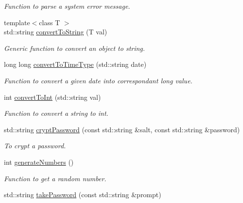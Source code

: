 \begin{DoxyCompactItemize}
\begin{DoxyCompactList}\small\item\em Function to parse a system error message. \item\end{DoxyCompactList}\item 
{\footnotesize template$<$class T $>$ }\\std::string \hyperlink{namespacevishnu_add18720aacc1db6052abecedd5d6feaa}{convertToString} (T val)
\begin{DoxyCompactList}\small\item\em Generic function to convert an object to string. \item\end{DoxyCompactList}\item 
long long \hyperlink{namespacevishnu_ae4208edfb8924443b0971e68cccfce02}{convertToTimeType} (std::string date)
\begin{DoxyCompactList}\small\item\em Function to convert a given date into correspondant long value. \item\end{DoxyCompactList}\item 
int \hyperlink{namespacevishnu_ac1899fb2792ddd63a003a06081fc9066}{convertToInt} (std::string val)
\begin{DoxyCompactList}\small\item\em Function to convert a string to int. \item\end{DoxyCompactList}\item 
std::string \hyperlink{namespacevishnu_ae8aa2ffafe24d1f575e8953d1d9d026e}{cryptPassword} (const std::string \&salt, const std::string \&password)
\begin{DoxyCompactList}\small\item\em To crypt a password. \item\end{DoxyCompactList}\item 
int \hyperlink{namespacevishnu_a93bc913d891933b4f9d7bc0382f72425}{generateNumbers} ()
\begin{DoxyCompactList}\small\item\em Function to get a random number. \item\end{DoxyCompactList}\item 
std::string \hyperlink{namespacevishnu_a699510f2ba6cb03bd9a6f3696abd9860}{takePassword} (const std::string \&prompt)

\end{DoxyCompactItemize}
